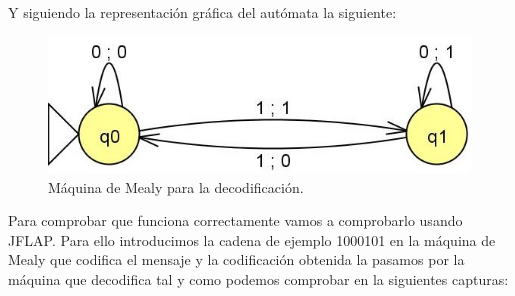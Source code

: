 Y siguiendo la representación gráfica del autómata la siguiente:

\begin{figure}[H]
	\centering
	\includegraphics[scale=0.5]{ejer3-decodifica.jpg}
	\caption{Máquina de Mealy para la decodificación.}
\end{figure}

Para comprobar que funciona correctamente vamos a comprobarlo usando JFLAP. Para ello introducimos la cadena de ejemplo 1000101 en la máquina de Mealy que codifica el mensaje y la codificación obtenida la pasamos por la máquina que decodifica tal y como podemos comprobar en la siguientes capturas:

